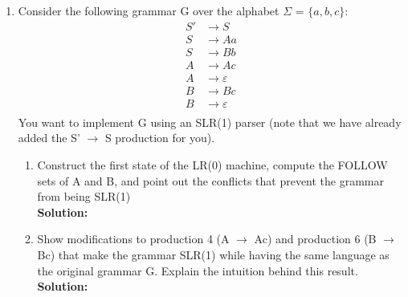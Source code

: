 \documentclass[11pt]{article}
\let\epsilon\varepsilon
\begin{document}
\begin{enumerate}
  \item Consider the following grammar G over the alphabet $\Sigma$ = $\{a,b,c\}$:
  \begin{equation*}
    \begin{split}
      S' &\to S \\
      S &\to Aa \\
      S &\to Bb \\
      A &\to Ac \\
      A &\to \epsilon\\
      B &\to Bc \\
      B &\to \epsilon \\
    \end{split}
  \end{equation*}
You want to implement G using an SLR(1) parser (note that we have already added the S' $\to$ S production for you). \begin{enumerate}
    \item Construct the first state of the LR(0) machine, compute the FOLLOW sets of A and B, and point out the conflicts that prevent the grammar from being SLR(1) \\
      \textbf{Solution:}
    
    \item Show modifications to production 4 (A $\to$ Ac) and production 6 (B $\to$ Bc) that make the grammar SLR(1) while having the same language as the original grammar G. Explain the intuition behind this result.\\
      \textbf{Solution:}

  \end{enumerate} 

\end{enumerate}
\end{document}
